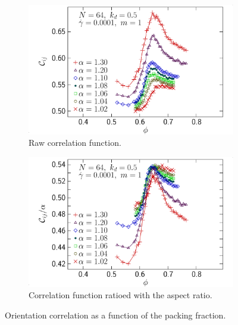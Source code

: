 \documentclass[class=report, float=false, crop=false]{standalone}
\begin{document}
\begin{figure}[h!]
\centering
    \begin{subfigure}[t]{0.49\textwidth}
        \centering
        \includegraphics[width=\textwidth]{figures/figs/orij_phi_prolate_0064_KDk500_Ml100_GDh100}
        \caption{Raw correlation function.}
        \label{orij_phi_prolate_0064_KDk500_Ml100_GDh100}
    \end{subfigure}
    \hfill
    \begin{subfigure}[t]{0.49\textwidth}
        \centering
        \includegraphics[width=\textwidth]{figures/figs/orijal_phi_prolate_0064_KDk500_Ml100_GDh100}
        \caption{Correlation function ratioed with the aspect ratio.}
        \label{orijal_phi_prolate_0064_KDk500_Ml100_GDh100}
    \end{subfigure}
    \caption{Orientation correlation as a function of the packing fraction.}
    \label{ori_phi_0064}
\end{figure}
\end{document}
